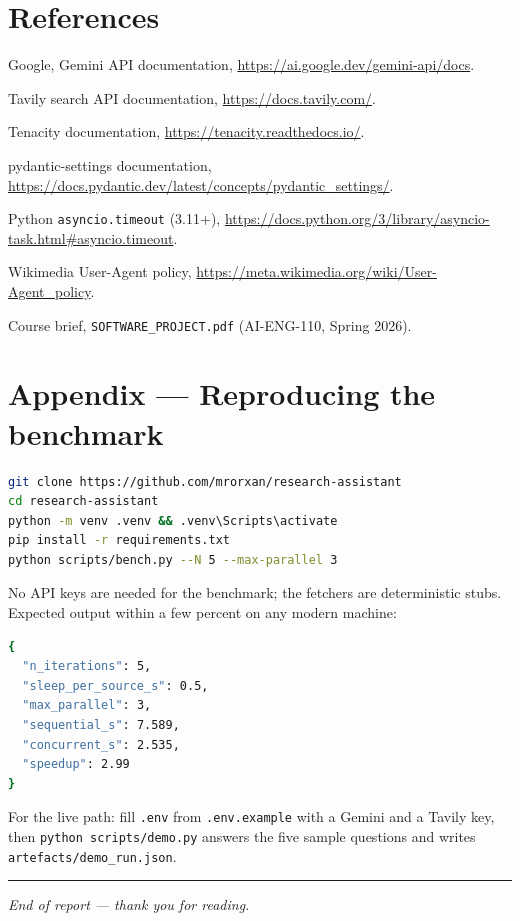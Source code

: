 \documentclass[11pt,a4paper]{article}
\begin{document}
\section*{References}

\begin{enumerate}[label={[\arabic*]},leftmargin=2.4em,itemsep=2pt]
  \item Google, Gemini API documentation, \url{https://ai.google.dev/gemini-api/docs}.
  \item Tavily search API documentation, \url{https://docs.tavily.com/}.
  \item Tenacity documentation, \url{https://tenacity.readthedocs.io/}.
  \item pydantic-settings documentation, \url{https://docs.pydantic.dev/latest/concepts/pydantic_settings/}.
  \item Python \texttt{asyncio.timeout} (3.11+), \url{https://docs.python.org/3/library/asyncio-task.html\#asyncio.timeout}.
  \item Wikimedia User-Agent policy, \url{https://meta.wikimedia.org/wiki/User-Agent_policy}.
  \item Course brief, \texttt{SOFTWARE\_PROJECT.pdf} (AI-ENG-110, Spring 2026).
\end{enumerate}

\appendix
\section{Appendix --- Reproducing the benchmark}

\begin{lstlisting}[style=python,language=bash,numbers=none]
git clone https://github.com/mrorxan/research-assistant
cd research-assistant
python -m venv .venv && .venv\Scripts\activate
pip install -r requirements.txt
python scripts/bench.py --N 5 --max-parallel 3
\end{lstlisting}

No API keys are needed for the benchmark; the fetchers are deterministic stubs. Expected output within a few percent on any modern machine:

\begin{lstlisting}[style=python,language=bash,numbers=none]
{
  "n_iterations": 5,
  "sleep_per_source_s": 0.5,
  "max_parallel": 3,
  "sequential_s": 7.589,
  "concurrent_s": 2.535,
  "speedup": 2.99
}
\end{lstlisting}

For the live path: fill \texttt{.env} from \texttt{.env.example} with a Gemini and a Tavily key, then \texttt{python scripts/demo.py} answers the five sample questions and writes \texttt{artefacts/demo\_run.json}.

\vspace{1em}\hrule\vspace{0.6em}
\noindent\small\textit{End of report --- thank you for reading.}
\end{document}
